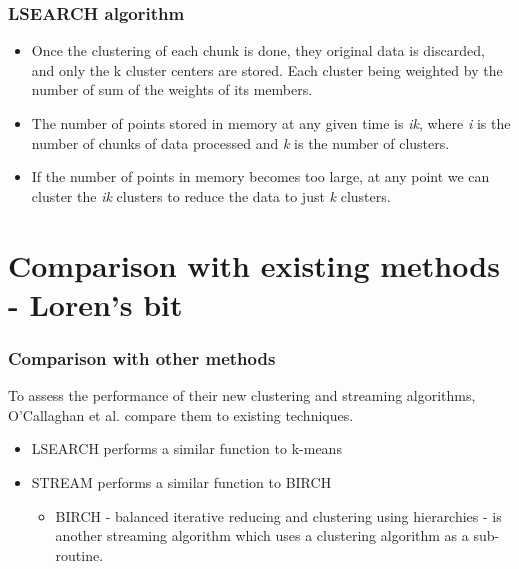 \documentclass{beamer}
\begin{document}
\frame
{
  \frametitle{LSEARCH algorithm}

   \begin{itemize}
  \item Once the clustering of each chunk is done, they original data
    is discarded, and only the k cluster centers are stored. Each
    cluster being weighted by the number of sum of the weights of its
    members.

  \item The number of points stored in memory at any given time is
    {\em ik}, where {\em i} is the number of chunks of data processed
    and {\em k} is the number of clusters.

  \item If the number of points in memory becomes too large, at any
    point we can cluster the {\em ik} clusters to reduce the data to
    just {\em k} clusters.
  \end{itemize}

}

\section{Comparison with existing methods - Loren's bit}
\frame
{
  \frametitle{Comparison with other methods}
  To assess the performance of their new clustering and streaming algorithms, O'Callaghan et al. compare them to existing techniques.
  
  \bigskip 
  \begin{itemize}
  \item{LSEARCH performs a similar function to k-means}
  \item{STREAM performs a similar function to BIRCH
    \begin{itemize}
      \item{BIRCH - balanced iterative reducing and clustering using hierarchies - is another streaming algorithm which uses a clustering algorithm as a sub-routine.}
    \end{itemize}
  }
  	     
  \end{itemize}
}
\end{document}
